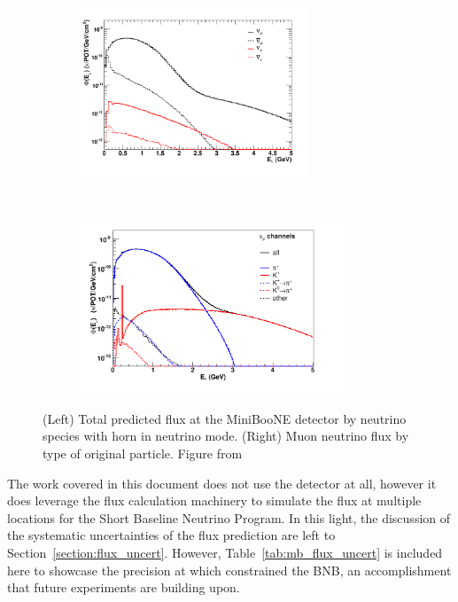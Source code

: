 \begin{figure}[tb]
  \centering

    \begin{subfigure}[t]{0.5\textwidth}
        \centering
        \includegraphics[height=2in]{beams_figures/mb_flux_nu}
    \end{subfigure}%
    ~ 
    \begin{subfigure}[t]{0.5\textwidth}
        \centering
        \includegraphics[height=2in]{beams_figures/mb_flux_by_type_nu}
    \end{subfigure}
  \caption[\MB Flux]{(Left) Total predicted flux at the MiniBooNE detector by neutrino species with horn in neutrino mode. (Right) Muon neutrino flux by type of original particle. Figure from  \cite{AguilarArevalo:2008yp}}
  \label{fig:mb_flux_nu}
\end{figure}

The work covered in this document does not use the \MB detector at all, however it does leverage the \MB flux calculation machinery to simulate the flux at multiple locations for the Short Baseline Neutrino Program.  In this light, the discussion of the systematic uncertainties of the flux prediction are left to Section~\ref{section:flux_uncert}.  However, Table~\ref{tab:mb_flux_uncert} is included here to showcase the precision at which \MB constrained the BNB, an accomplishment that future experiments are building upon.

